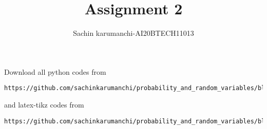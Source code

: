 \documentclass[journal,12pt,twocolumn]{IEEEtran}
\DeclareMathOperator*{\Res}{Res}
\begin{document}
\newcommand{\BEQA}{\begin{eqnarray}}
\newcommand{\EEQA}{\end{eqnarray}}
\newcommand{\define}{\stackrel{\triangle}{=}}

\raggedbottom
\setlength{\parindent}{0pt}
\providecommand{\mbf}{\mathbf}
\providecommand{\pr}[1]{\ensuremath{\Pr\left(#1\right)}}
\providecommand{\qfunc}[1]{\ensuremath{Q\left(#1\right)}}
\providecommand{\sbrak}[1]{\ensuremath{{}\left[#1\right]}}
\providecommand{\lsbrak}[1]{\ensuremath{{}\left[#1\right.}}
\providecommand{\rsbrak}[1]{\ensuremath{{}\left.#1\right]}}
\providecommand{\brak}[1]{\ensuremath{\left(#1\right)}}
\providecommand{\lbrak}[1]{\ensuremath{\left(#1\right.}}
\providecommand{\rbrak}[1]{\ensuremath{\left.#1\right)}}
\providecommand{\cbrak}[1]{\ensuremath{\left\{#1\right\}}}
\providecommand{\lcbrak}[1]{\ensuremath{\left\{#1\right.}}
\providecommand{\rcbrak}[1]{\ensuremath{\left.#1\right\}}}
\theoremstyle{remark}
\newtheorem{rem}{Remark}
\newcommand{\sgn}{\mathop{\mathrm{sgn}}}
\providecommand{\abs}[1]{\vert#1\vert}
\providecommand{\res}[1]{\Res\displaylimits_{#1}} 
\providecommand{\norm}[1]{\lVert#1\rVert}
\providecommand{\mtx}[1]{\mathbf{#1}}
\providecommand{\mean}[1]{E[ #1 ]}
\providecommand{\fourier}{\overset{\mathcal{F}}{ \rightleftharpoons}}
\providecommand{\system}{\overset{\mathcal{H}}{ \longleftrightarrow}}
\newcommand{\solution}{\noindent \textbf{Solution: }}
\newcommand{\cosec}{\,\text{cosec}\,}
\providecommand{\dec}[2]{\ensuremath{\overset{#1}{\underset{#2}{\gtrless}}}}
\newcommand{\myvec}[1]{\ensuremath{\begin{pmatrix}#1\end{pmatrix}}}
\newcommand{\mydet}[1]{\ensuremath{\begin{vmatrix}#1\end{vmatrix}}}
\makeatletter
{}
\makeatother
\let\StandardTheFigure\thefigure
\let\vec\mathbf
\renewcommand{\thefigure}{\theproblem}
\def\putbox#1#2#3{\makebox[0in][l]{\makebox[#1][l]{}\raisebox{\baselineskip}[0in][0in]{\raisebox{#2}[0in][0in]{#3}}}}
     \def\rightbox#1{\makebox[0in][r]{#1}}
     \def\centbox#1{\makebox[0in]{#1}}
     \def\topbox#1{\raisebox{-\baselineskip}[0in][0in]{#1}}
     \def\midbox#1{\raisebox{-0.5\baselineskip}[0in][0in]{#1}}
\vspace{3cm}
\title{Assignment 2}
\author{Sachin karumanchi-AI20BTECH11013}
\maketitle
\newpage
\bigskip
\renewcommand{\thefigure}{\theenumi}
\renewcommand{\thetable}{\theenumi}
Download all python codes from 
\begin{lstlisting}
https://github.com/sachinkarumanchi/probability_and_random_variables/blob/assignment2/assignment2.py
\end{lstlisting}
%
and latex-tikz codes from 
%
\begin{lstlisting}
https://github.com/sachinkarumanchi/probability_and_random_variables/blob/assignment2/Assignment2.tex
\end{lstlisting}
\end{document}

